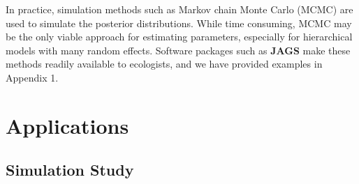 \documentclass[12pt,english]{article}
\begin{document}
\begin{spacing}{1.9}
\begin{flushleft}
In
practice, simulation methods such as Markov chain Monte Carlo (MCMC)
are used to simulate the posterior distributions. While time
consuming, MCMC may be the only viable approach for estimating
parameters, especially for hierarchical models with many random
effects.  
Software packages such as %
\textbf{JAGS} \citep{plummer:2003} make these methods readily
available to ecologists, and we have provided examples in 
Appendix 1. 





\section*{Applications}
\label{sec:app}

\subsection*{Simulation Study}



\end{flushleft}
\end{spacing}
\end{document}
